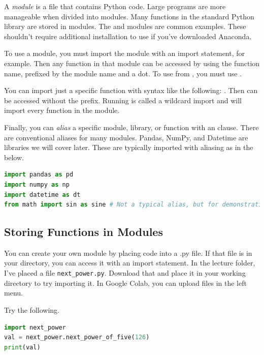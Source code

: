 
A \emph{module} is a file that contains Python code. Large programs are more manageable when divided into modules. Many functions in the standard Python library are stored in modules. The  and  modules are common examples. These shouldn't require additional installation to use if you've downloaded Anaconda. 

To use a module, you must import the module with an import statement,  for example. Then any function in that module can be accessed by using the function name, prefixed by the module name and a dot. To use  from , you must use . 

You can import just a specific function with syntax like the following: . Then  can be accessed without the  prefix. Running  is called a wildcard import and will import every function in the module. 

Finally, you can \emph{alias} a specific module, library, or function with an  clause. There are conventional aliases for many modules. Pandas, NumPy, and Datetime are libraries we will cover later. These are typically imported with aliasing as in the below. 

\begin{lstlisting}[language = Python]
import pandas as pd
import numpy as np
import datetime as dt
from math import sin as sine # Not a typical alias, but for demonstration
\end{lstlisting}

\subsection{Storing Functions in Modules}
You can create your own module by placing code into a .py file. If that file is in your directory, you can access it with an import statement. In the lecture folder, I've placed a file \texttt{next\_power.py}. Download that and place it in your working directory to try importing it. In Google Colab, you can upload files in the left menu. 

Try the following.

\begin{lstlisting}[language = Python]
import next_power
val = next_power.next_power_of_five(126)
print(val)
\end{lstlisting}

